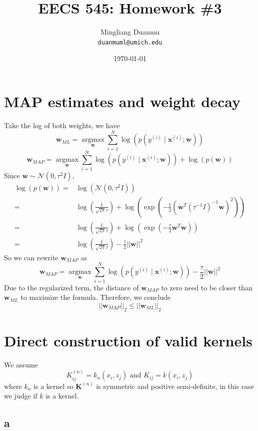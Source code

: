 \documentclass{article}
\title{EECS 545: Homework \#3} %
\author{Mingliang Duanmu\\ \texttt{duanmuml@umich.edu}} %
\date{\today} %
\begin{document}
\maketitle %

\section{MAP estimates and weight decay}

Take the log of both weights, we have
$$\mathbf{w}_{ML} = \underset{\mathbf{w}}{\operatorname{argmax}} \sum_{i=1}^{N} \log (p(y^{(i)} \mid \mathbf{x}^{(i)} ; \mathbf{w}))$$
$$\mathbf{w}_{MAP} = \underset{\mathbf{w}}{\operatorname{argmax}} \sum_{i=1}^{N} \log (p(y^{(i)} \mid \mathbf{x}^{(i)} ; \mathbf{w})) + \log(p(\mathbf{w}))$$
Since $\mathbf{w} \sim \mathcal{N}(0, \tau^{2} I)$,
$$
\begin{aligned}
\log(p(\mathbf{w})) = & \log(\mathcal{N}(0, \tau^2 I)) \\
= & \log(\frac{1}{\sqrt{2\pi} \tau}) + \log(\exp(-\frac{1}{2}(\mathbf{w}^T (\tau^{-1} I)^{-1} \mathbf{w})^2)) \\ 
= & \log(\frac{1}{\sqrt{2\pi} \tau}) + \log(\exp(-\frac{\tau}{2}\mathbf{w}^T \mathbf{w})) \\
= & \log(\frac{1}{\sqrt{2\pi} \tau}) - \frac{\tau}{2}||\mathbf{w}||^2
\end{aligned}
$$
So we can rewrite $\mathbf{w}_{MAP}$ as
$$\mathbf{w}_{MAP} = \underset{\mathbf{w}}{\operatorname{argmax}} \sum_{i=1}^{N} \log (p(y^{(i)} \mid \mathbf{x}^{(i)} ; \mathbf{w})) - \frac{\tau}{2}||\mathbf{w}||^2$$
Due to the regularized term, the distance of $\mathbf{w}_{MAP}$ to zero need to be closer than $\mathbf{w}_{ML}$ to maximize the formula. Therefore, we conclude
$$||\mathbf{w}_{MAP}||_2 \leq ||\mathbf{w}_{ML}||_2$$

\section{Direct construction of valid kernels}

We assume
$$K^{(n)}_{ij} = k_n(x_i, z_j) \text{ and } K_{ij} = k(x_i, z_j)$$
where $k_n$ is a kernel so $\mathbf{K}^{(n)}$ is symmetric and positive semi-definite, in this case we judge if $k$ is a kernel.

\subsection*{a}
\end{document}
